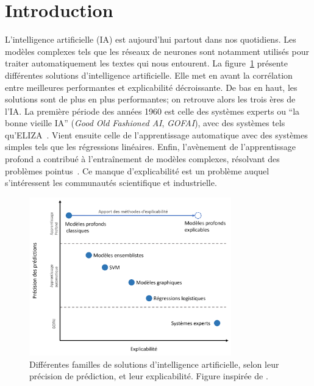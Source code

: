 \chapter*{Introduction}

L'intelligence artificielle (IA) est aujourd'hui partout dans nos quotidiens. Les modèles complexes tels que les réseaux de neurones sont notamment utilisés pour traiter automatiquement les textes qui nous entourent.
La figure~\ref{fig:ratio_perf_explicabilite} présente différentes solutions d'intelligence artificielle. Elle met en avant la corrélation entre meilleures performantes et explicabilité décroissante.
De bas en haut, les solutions sont de plus en plus performantes; on retrouve alors les trois ères de l'IA. La première période des années 1960 est celle des systèmes experts ou ``la bonne vieille IA'' (\textit{Good Old Fashioned AI}, \textit{GOFAI}), avec des systèmes tels qu'ELIZA~\cite{Weizenbaum1966}.
Vient ensuite celle de l'apprentissage automatique avec des systèmes simples tels que les régressions linéaires. %
Enfin, l'avènement de l'apprentissage profond a contribué à l'entraînement de modèles complexes, résolvant des problèmes pointus~\cite{LeCun2015}.
Ce manque d'explicabilité est un problème auquel s'intéressent les communautés scientifique et industrielle.
\begin{figure}[htpb!]
    \centering
    \includegraphics[width=0.78\textwidth]{Introduction/figures/performance_explicabilite.png}
    \caption{Différentes familles de solutions d'intelligence artificielle, selon leur précision de prédiction, et leur explicabilité. Figure inspirée de \cite{Dam2018}.}
    \label{fig:ratio_perf_explicabilite}
\end{figure}

